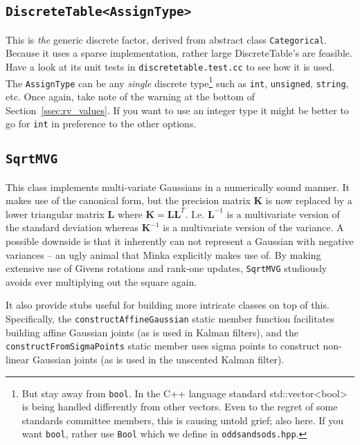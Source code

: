 \documentclass[english]{article}
\begin{document}
\subsection{\texttt{DiscreteTable<AssignType>}} \label{ssec:DT}

This is \emph{the} generic discrete factor, derived from abstract
class \texttt{Categorical}. Because it uses a sparse implementation,
rather large DiscreteTable's are feasible. Have a look at its unit
tests in \texttt{discretetable.test.cc} to see how it is used. The
\texttt{AssignType} can be any \emph{single} discrete
type\footnote{But stay away from \texttt{bool}. In the C++ language
standard std::vector<bool> is being handled differently from other
vectors. Even to the regret of some standards committee members, this
is causing untold grief; also here. If you want \texttt{bool}, rather
use \texttt{Bool} which we define in \texttt{oddsandsods.hpp}.  } such
as \texttt{int}, \texttt{unsigned}, \texttt{string}, etc. Once again,
take note of the warning at the bottom of
Section~\ref{ssec:rv_values}. If you want to use an integer type it
might be better to go for \texttt{int} in preference to the other
options.

\subsection{\texttt{SqrtMVG}}

This class implements multi-variate Gaussians in a numerically sound
manner. It makes use of the canonical form, but the precision matrix
$\bm{K}$ is now replaced by a lower triangular matrix $\bm{L}$ where
$\bm{K}=\bm{L}\bm{L}^T$. I.e. $\bm{L}^{-1}$ is a multivariate version
of the standard deviation whereas $\bm{K}^{-1}$ is a multivariate
version of the variance. A possible downside is that it inherently can
not represent a Gaussian with negative variances -- an ugly animal
that Minka explicitly makes use of. By making extensive use of
Givens rotations and rank-one updates, \texttt{SqrtMVG} studiously
avoids ever multiplying out the square again.

It also provide stubs useful for building more intricate classes on
top of this. Specifically,
the \newline\texttt{constructAffineGaussian} static member function
facilitates building affine Gaussian joints (as is used in Kalman
filters), and the \texttt{constructFromSigmaPoints} static member uses
sigma points to construct non-linear Gaussian joints (as is used in
the unscented Kalman filter).
\end{document}

